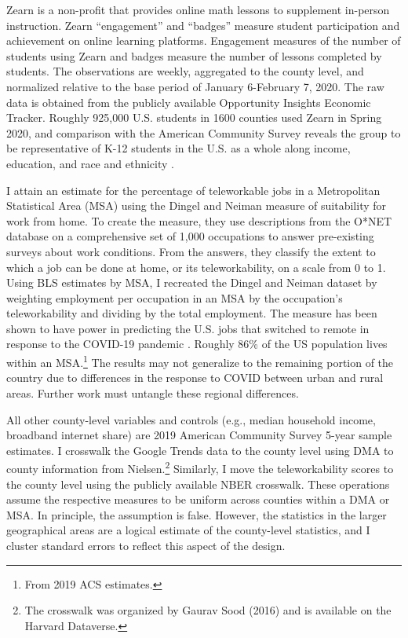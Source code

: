 	Zearn is a non-profit that provides online math lessons to supplement in-person instruction.
        Zearn “engagement” and “badges” measure student participation and achievement on online learning platforms.
        Engagement measures of the number of students using Zearn and badges measure the number of lessons completed by students.
        The observations are weekly, aggregated to the county level, and normalized relative to the base period of January 6-February 7, 2020.
        The raw data is obtained from the publicly available Opportunity Insights Economic Tracker.
        Roughly 925,000 U.S. students in 1600 counties used Zearn in Spring 2020, and comparison with the American Community Survey reveals the group to be representative of K-12 students in the U.S. as a whole along income, education, and race and ethnicity \citep{chetty}.
        \par
I attain an estimate for the percentage of teleworkable jobs in a Metropolitan Statistical Area (MSA) using the Dingel and Neiman measure of suitability for work from home.
To create the measure, they use descriptions from the O*NET database on a comprehensive set of 1,000 occupations to answer pre-existing surveys about work conditions.
From the answers, they classify the extent to which a job can be done at home, or its teleworkability, on a scale from 0 to 1.
Using BLS estimates by MSA, I recreated the Dingel and Neiman dataset by weighting employment per occupation in an MSA by the occupation’s teleworkability and dividing by the total employment.
The \cite{dingel} measure has been shown to have power in predicting the U.S. jobs that switched to remote in response to the COVID-19 pandemic \citep{blandin, bartik}.
Roughly 86\% of the US population lives within an MSA.\footnote{From 2019 ACS estimates.} The results may not generalize to the remaining portion of the country due to differences in the response to COVID between urban and rural areas. Further work must untangle these regional differences.

\if{}
All other county-level variables and controls (e.g., median household income, broadband internet share) are 2019 American Community Survey 5-year sample estimates.
I crosswalk the Google Trends data to the county level using DMA to county information from Nielsen.\footnote{The crosswalk was organized by Gaurav Sood (2016) and is available on the Harvard Dataverse.} Similarly, I move the teleworkability scores to the county level using the publicly available NBER crosswalk.
These operations assume the respective measures to be uniform across counties within a DMA or MSA.
In principle, the assumption is false.
However, the statistics in the larger geographical areas are a logical estimate of the county-level statistics, and I cluster standard errors to reflect this aspect of the design.
\fi

